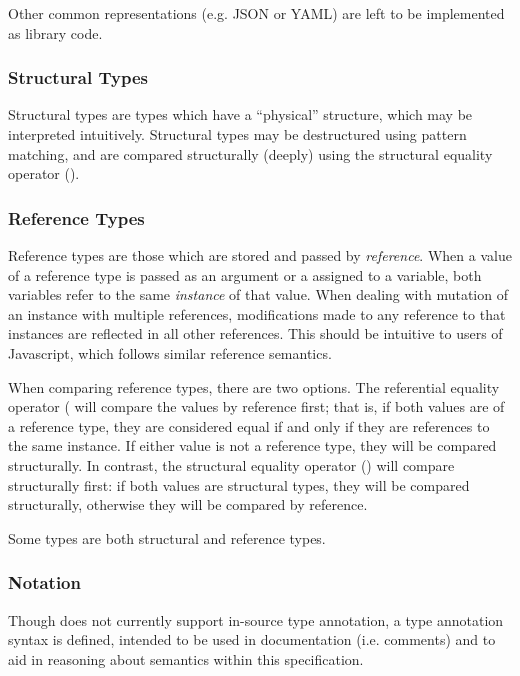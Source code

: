 Other common representations (e.g. JSON or YAML) are left
to be implemented as library code.

\subsubsection{Structural Types}
\label{sec:structuraltypes}

Structural types are types which have a ``physical'' structure, which may be
interpreted intuitively. Structural types may be destructured using pattern
matching, and are compared structurally (deeply) using the structural equality
operator (\op{==}).

\subsubsection{Reference Types}
\label{sec:referencetypes}

Reference types are those which are stored and passed by \emph{reference}. When
a value of a reference type is passed as an argument or a assigned to a variable, both
variables refer to the same \emph{instance} of that value. When dealing with
mutation of an instance with multiple references, modifications made to any
reference to that instances are reflected in all other references. This should be
intuitive to users of Javascript, which follows similar reference semantics.

When comparing reference types, there are two options. The referential equality
operator (\op{===)} will compare the values by reference first; that is, if
both values are of a reference type, they are considered equal if and only
if they are references to the same instance. If either value is not a reference
type, they will be compared structurally. In contrast, the structural equality
operator (\kw{==}) will compare structurally first: if both values are structural
types, they will be compared structurally, otherwise they will be compared by
reference.

Some types are both structural and reference types.

\subsubsection{Notation}

Though \Trilogy{} does not currently support in-source type annotation, a
type annotation syntax is defined, intended to be used in documentation
(i.e. comments) and to aid in reasoning about semantics within this specification.


